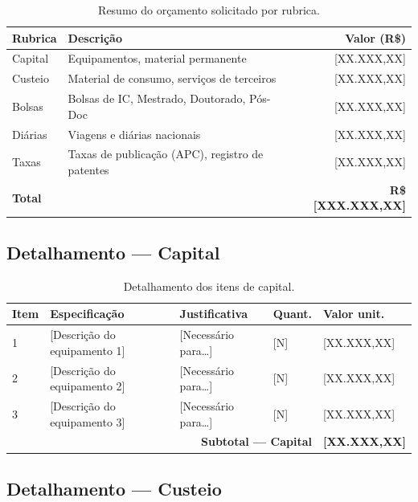 \documentclass[
  12pt,
  a4paper,
  oneside,
  english,      %
  brazil
]{article}
\begin{document}
\begin{table}[H]
  \centering
  \caption{Resumo do orçamento solicitado por rubrica.}
  \label{tab:resumo-orcamento}
  \begin{tabularx}{\textwidth}{lXr}
    \toprule
    \textbf{Rubrica} & \textbf{Descrição} & \textbf{Valor (R\$)} \\
    \midrule
    Capital     & Equipamentos, material permanente         & [XX.XXX,XX] \\
    Custeio     & Material de consumo, serviços de terceiros & [XX.XXX,XX] \\
    Bolsas      & Bolsas de IC, Mestrado, Doutorado, Pós-Doc & [XX.XXX,XX] \\
    Diárias     & Viagens e diárias nacionais                 & [XX.XXX,XX] \\
    Taxas       & Taxas de publicação (APC), registro de patentes & [XX.XXX,XX] \\
    \midrule
    \textbf{Total} & & \textbf{R\$ [XXX.XXX,XX]} \\
    \bottomrule
  \end{tabularx}
\end{table}

\subsection{Detalhamento — Capital}

\begin{table}[H]
  \centering
  \caption{Detalhamento dos itens de capital.}
  \label{tab:orcamento-capital}
  \begin{tabularx}{\textwidth}{p{1.5cm}Xp{2cm}p{1.8cm}p{1.8cm}}
    \toprule
    \textbf{Item} & \textbf{Especificação} & \textbf{Justificativa} &
    \textbf{Quant.} & \textbf{Valor unit.} \\
    \midrule
    1 & [Descrição do equipamento 1] & [Necessário para…] & [N] & [XX.XXX,XX] \\
    2 & [Descrição do equipamento 2] & [Necessário para…] & [N] & [XX.XXX,XX] \\
    3 & [Descrição do equipamento 3] & [Necessário para…] & [N] & [XX.XXX,XX] \\
    \midrule
    \multicolumn{4}{r}{\textbf{Subtotal — Capital}} & \textbf{[XX.XXX,XX]} \\
    \bottomrule
  \end{tabularx}
\end{table}

\subsection{Detalhamento — Custeio}
\end{document}
